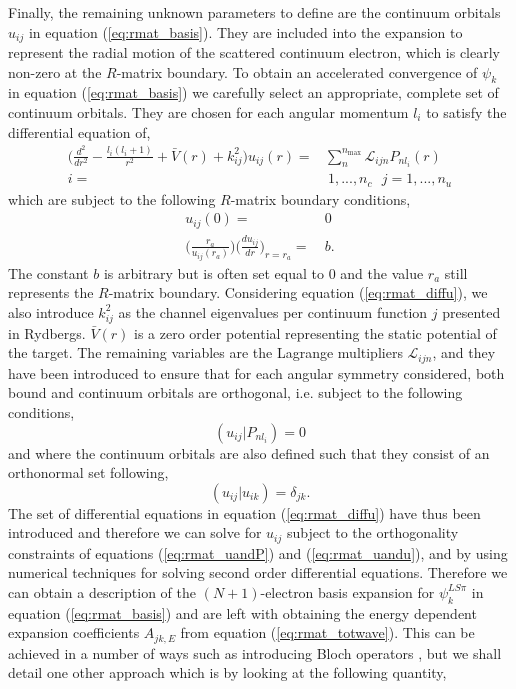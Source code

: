 Finally, the remaining unknown parameters to define are the continuum orbitals $u_{ij}$ in equation (\ref{eq:rmat_basis}). They are included into the expansion to represent the radial motion of the scattered continuum electron, which is clearly non-zero at the $R$-matrix boundary. To obtain an accelerated convergence of $\psi_k$ in equation (\ref{eq:rmat_basis}) we carefully select an appropriate, complete set of continuum orbitals. They are chosen for each angular momentum $l_i$ to satisfy the differential equation of,
\begin{equation}\label{eq:rmat_diffu}
\begin{split}
\Big(\frac{d^2}{dr^2}-\frac{l_i(l_i+1)}{r^2}+\bar{V}(r)+k_{ij}^2\Big)u_{ij}(r)=&\sum_n^{n_{\text{max}}}\mathcal{L}_{ijn}P_{nl_i}(r)\\
i=&~1,...,n_c  ~~~ j=1,...,n_u
\end{split}
\end{equation}
which are subject to the following $R$-matrix boundary conditions,
\begin{equation}\label{eq:rmat_boundarycond}
\begin{split}
u_{ij}(0)= &~ 0\\
\Big(\frac{r_a}{u_{ij}(r_a)}\Big)\Big(\frac{du_{ij}}{dr}\Big)_{r=r_a}= &~ b.
\end{split}
\end{equation}
The constant $b$ is arbitrary but is often set equal to 0 and the value $r_a$ still represents the $R$-matrix boundary. Considering equation (\ref{eq:rmat_diffu}), we also introduce $k_{ij}^2$ as the channel eigenvalues per continuum function $j$ presented in Rydbergs. $\bar{V}(r)$ is a zero order potential representing the static potential of the target. The remaining variables are the Lagrange multipliers $\mathcal{L}_{ijn}$, and they have been introduced to ensure that for each angular symmetry considered, both bound and continuum orbitals are orthogonal, i.e. subject to the following conditions,
\begin{equation}\label{eq:rmat_uandP}
(u_{ij}|P_{nl_i})=0
\end{equation}
and where the continuum orbitals are also defined such that they consist of an orthonormal set following,
\begin{equation}\label{eq:rmat_uandu}
(u_{ij}|u_{ik})=\delta_{jk}.
\end{equation}
The set of differential equations in equation (\ref{eq:rmat_diffu}) have thus been introduced and therefore we can solve for $u_{ij}$ subject to the orthogonality constraints of equations (\ref{eq:rmat_uandP}) and (\ref{eq:rmat_uandu}), and by using numerical techniques for solving second order differential equations. Therefore we can obtain a description of the $(N+1)$-electron basis expansion for $\psi^{LS\pi}_k$ in equation (\ref{eq:rmat_basis}) and are left with obtaining the energy dependent expansion coefficients $A_{jk,E}$ from equation (\ref{eq:rmat_totwave}). This can be achieved in a number of ways such as introducing Bloch operators \citep{1957NucPh...4..503B}, but we shall detail one other approach which is by looking at the following quantity,
